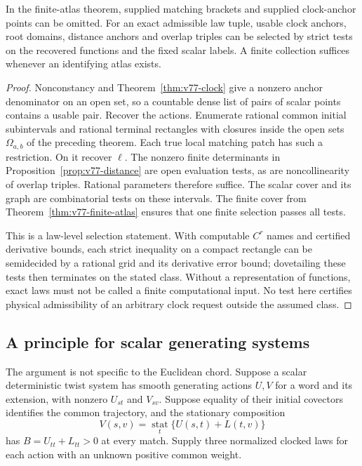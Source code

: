 \begin{corollary}
\label{cor:v78-certificates}
In the finite-atlas theorem, supplied matching brackets and supplied
clock-anchor points can be omitted.  For an exact admissible law tuple,
usable clock anchors, root domains, distance anchors and overlap triples
can be selected by strict tests on the recovered functions and the fixed
scalar labels.  A finite collection suffices whenever an identifying
atlas exists.
\end{corollary}
\begin{proof}
Nonconstancy and Theorem~\ref{thm:v77-clock} give a nonzero anchor
denominator on an open set, so a countable dense list of pairs of scalar
points contains a usable pair.  Recover the actions.  Enumerate rational
common initial subintervals and rational terminal rectangles with closures
inside the open sets $\Omega_{a,b}$ of the preceding theorem.  Each true
local matching patch has such a restriction.  On it recover $\ell$.
The nonzero finite determinants in
Proposition~\ref{prop:v77-distance} are open evaluation tests, as are
noncollinearity of overlap triples.  Rational parameters therefore
suffice.  The scalar cover and its graph are combinatorial tests on these
intervals.  The finite cover from Theorem~\ref{thm:v77-finite-atlas}
ensures that one finite selection passes all tests.

This is a law-level selection statement.  With computable $C^r$ names
and certified derivative bounds, each strict inequality on a compact
rectangle can be semidecided by a rational grid and its derivative error
bound; dovetailing these tests then terminates on the stated class.
Without a representation of functions, exact laws must not be called
a finite computational input.  No test here certifies physical
admissibility of an arbitrary clock request outside the assumed class.
\end{proof}

\subsection{A principle for scalar generating systems}

The argument is not specific to the Euclidean chord.  Suppose a scalar
deterministic twist system has smooth generating actions $U,V$ for a
word and its extension, with nonzero $U_{st}$ and $V_{sv}$.  Suppose equality of their
initial covectors identifies the common trajectory, and the stationary
composition
\[
             V(s,v)=\operatorname*{stat}_t\{U(s,t)+L(t,v)\}
\]
has $B=U_{tt}+L_{tt}>0$ at every match.  Supply three normalized
clocked laws for each action with an unknown positive common weight.

